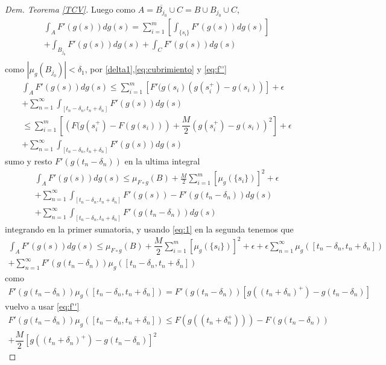 \begin{proof}[Dem. Teorema \eqref{TCV}]
	Luego como $A=\overline{B_{j_0}}\cup C=B\cup B_{j_0}\cup C$, 
	\begin{multline*}
		\int_{A}F'(g(s))dg(s)=\sum_{i=1}^{m}\left[ \int_{\{s_i\}}F'(g(s))dg(s)\right] \\+\int_{B_{j_0}}F'(g(s))dg(s)+\int_{C}F'(g(s))dg(s)\\
	\end{multline*}
como $|\mu_{g}(B_{j_0})|<\delta_1$, por \eqref{delta1},\eqref{eq:cubrimiento} y  \ref{eq:f''}
		\begin{multline*}
			\int_{A}F'(g(s))dg(s)\leq \sum_{i=1}^{m}\left[ F'(g(s_i)\left( g(s_i^+)-g(s_i)\right)  \right] +\epsilon\\+\sum_{n=1}^{\infty}\int_{[t_n-\delta_n, t_n+\delta_n]}F'(g(s))dg(s)\\ \leq 
		 \sum_{i=1}^{m}\left[ \left( F(g(s_i^+)-F(g(s_i))\right) +\dfrac{M}{2}\left( g(s_i^+)-g(s_i)\right)^2  \right] +\epsilon\\+\sum_{n=1}^{\infty}\int_{[t_n-\delta_n, t_n+\delta_n]}F'(g(s))dg(s)
\end{multline*}
sumo y resto $F'(g(t_n-\delta_n))$ en la ultima integral
	\begin{multline*}
\int_{A}F'(g(s))dg(s) 
	\leq \mu_{F\circ g}(B)+\frac{M}{2}\sum_{i=1}^{m}\left[ \mu_{g}(\{s_i\})\right] ^2+\epsilon \\+ \sum_{n=1}^{\infty}\int_{[t_n-\delta_n, t_n+\delta_n]}F'(g(s))-F'(g(t_n-\delta_n))dg(s)\\
+\sum_{n=1}^{\infty}\int_{[t_n-\delta_n, t_n+\delta_n]}F'(g(t_n-\delta_n))dg(s)
	\end{multline*}
 integrando en la primer sumatoria, y usando \ref{eq:1} en la segunda  tenemos que
	\begin{multline*}
		\int_{A}F'(g(s))dg(s)	\leq \mu_{F\circ g}(B)+\dfrac{M}{2}\sum_{i=1}^{m} \left[ \mu_{g}(\{s_i\})\right] ^2+\epsilon+\epsilon\sum_{n=1}^{\infty}\mu_{g}\left( [t_n-\delta_n, t_n+\delta_n]\right) \\+ \sum_{n=1}^{\infty}F'(g(t_n-\delta_n))\mu_{g}([t_n-\delta_n,t_n+\delta_n] ) 
	\end{multline*}
como
\begin{multline*}
F'(g(t_n-\delta_n))\mu_{g}([t_n-\delta_n,t_n+\delta_n] ) = F'(g(t_n-\delta_n))\left[g((t_n+\delta_n)^+)-g(t_n-\delta_n) \right] 
\end{multline*}
vuelvo a usar \ref{eq:f''}
\begin{multline*}
F'(g(t_n-\delta_n))\mu_{g}([t_n-\delta_n,t_n+\delta_n] ) \leq F(g((t_n+\delta_n^+)))-F(g(t_n-\delta_n))\\+\dfrac{M}{2}\left[g((t_n+\delta_n)^+)-g(t_n-\delta_n) \right]^2

\end{multline*}
\end{proof}
